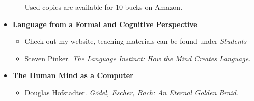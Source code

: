 \begin{itemize}
\begin{itemize}
                \smallskip
                Used copies are available for 10 bucks on Amazon.
        \end{itemize}
    \item \textbf{Language from a Formal and Cognitive Perspective}
        \begin{itemize}
            \item Check out my website, teaching materials can be found under \emph{Students}
            \item Steven Pinker. \emph{The Language Instinct: How the Mind Creates Language}.
        \end{itemize}
    \item \textbf{The Human Mind as a Computer}
        \begin{itemize}
            \item Douglas Hofstadter. \emph{Gödel, Escher, Bach: An Eternal Golden Braid}.
        \end{itemize}
\end{itemize}
